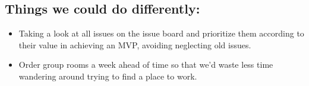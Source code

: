 \documentclass{article}
\begin{document}
\subsection{Things we could do differently:}
\begin{itemize}
\item  Taking a look at all issues on the issue board and prioritize them according to their value in achieving an MVP, avoiding neglecting old issues.
    \item Order group rooms a week ahead of time so that we'd waste less time wandering around trying to find a place to work.
\end{itemize}
\end{document}
